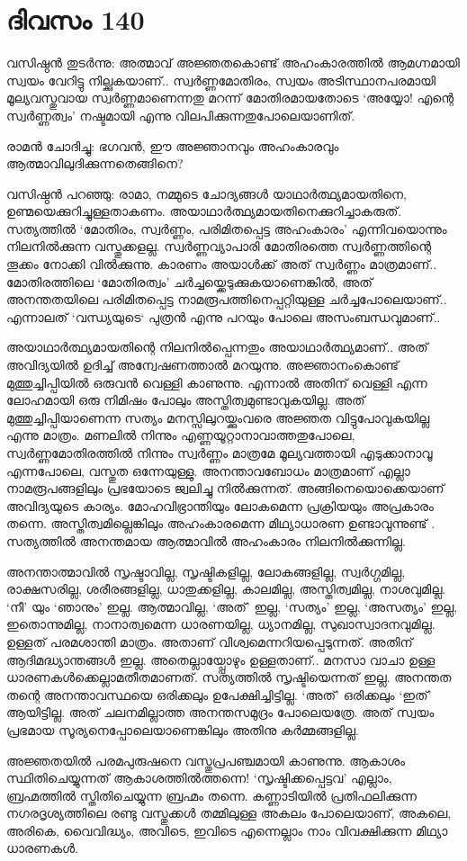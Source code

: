  
\section{ദിവസം 140}


വസിഷ്ഠൻ തുടർന്നു: അത്മാവ് അജ്ഞതകൊണ്ട് അഹംകാരത്തിൽ ആമഗ്നമായി സ്വയം വേറിട്ടു നില്ക്കുകയാണ്‌..  സ്വർണ്ണമോതിരം, സ്വയം അടിസ്ഥാനപരമായി മൂല്യവസ്തുവായ സ്വർണ്ണമാണെന്നതു മറന്ന് മോതിരമായതോടെ  ‘അയ്യോ! എന്റെ സ്വർണ്ണത്വം’ നഷ്ടമായി എന്നു വിലപിക്കുന്നതുപോലെയാണിത്.

രാമൻ ചോദിച്ചു: ഭഗവൻ, ഈ അജ്ഞാനവും അഹംകാരവും ആത്മാവിലുദിക്കുന്നതെങ്ങിനെ?

വസിഷ്ഠൻ പറഞ്ഞു: രാമാ, നമ്മുടെ ചോദ്യങ്ങൾ യാഥാർത്ഥ്യമായതിനെ, ഉണ്മയെക്കുറിച്ചുള്ളതാകണം. അയാഥാർത്ഥ്യമായതിനെക്കുറിച്ചാകരുത്. സത്യത്തിൽ ‘മോതിരം, സ്വർണ്ണം, പരിമിതപ്പെട്ട അഹംകാരം’ എന്നിവയൊന്നും നിലനിൽക്കുന്ന വസ്തുക്കളല്ല. സ്വർണ്ണവ്യാപാരി മോതിരത്തെ സ്വർണ്ണത്തിന്റെ തൂക്കം നോക്കി വിൽക്കുന്നു. കാരണം അയാൾക്ക് അത് സ്വർണ്ണം മാത്രമാണ്‌..  മോതിരത്തിലെ ‘മോതിരത്വം’ ചർച്ചയ്ക്കെടുക്കുകയാണെങ്കിൽ, അത് അനന്തതയിലെ പരിമിതപ്പെട്ട നാമരൂപത്തിനെപ്പറ്റിയുള്ള ചർച്ചപോലെയാണ്‌..  എന്നാലത് `വന്ധ്യയുടെ`  പുത്രൻ എന്നു പറയും പോലെ അസംബന്ധവുമാണ്‌.. 

അയാഥാർത്ഥ്യമായതിന്റെ നിലനിൽപ്പെന്നതും അയാഥാർത്ഥ്യമാണ്‌..  അത് അവിദ്യയിൽ ഉദിച്ച് അന്വേഷണത്താൽ മറയുന്നു. അജ്ഞാനംകൊണ്ട് മുത്തുച്ചിപ്പിയിൽ ഒരുവൻ വെള്ളി കാണുന്നു. എന്നാൽ അതിന്‌ വെള്ളി എന്ന ലോഹമായി ഒരു നിമിഷം പോലും അസ്തിത്വമുണ്ടാവുകയില്ല. അത് മുത്തുച്ചിപ്പിയാണെന്ന സത്യം മനസ്സിലുറയ്ക്കുംവരെ അജ്ഞത വിട്ടുപോവുകയില്ല എന്നു മാത്രം. മണലിൽ നിന്നും എണ്ണയൂറ്റാനാവാത്തതുപോലെ, സ്വർണ്ണമോതിരത്തിൽ നിന്നും സ്വർണ്ണം മാത്രമേ മൂല്യവത്തായി എടുക്കാനാവൂ എന്നപോലെ, വസ്തുത ഒന്നേയുള്ളു. അനന്താവബോധം മാത്രമാണ്‌ എല്ലാ നാമരൂപങ്ങളിലും പ്രഭയോടെ ജ്വലിച്ചു നിൽക്കുന്നത്. അങ്ങിനെയൊക്കെയാണ്‌ അവിദ്യയുടെ കാര്യം. മോഹവിഭ്രാന്തിയും ലോകമെന്ന പ്രക്രിയയും അപ്രകാരം തന്നെ. അസ്തിത്വമില്ലെങ്കിലും അഹംകാരമെന്ന മിഥ്യാധാരണ ഉണ്ടാവുന്നുണ്ട് . സത്യത്തിൽ അനന്തമായ ആത്മാവിൽ അഹംകാരം നിലനിൽക്കുന്നില്ല.

അനന്താത്മാവിൽ സൃഷ്ടാവില്ല, സൃഷ്ടികളില്ല, ലോകങ്ങളില്ല, സ്വർഗ്ഗമില്ല, രാക്ഷസരില്ല, ശരീരങ്ങളില്ല, ധാതുക്കളില്ല, കാലമില്ല, അസ്തിത്വമില്ല, നാശവുമില്ല. ‘നീ’ യും ‘ഞാനും’ ഇല്ല. ആത്മാവില്ല, ‘അത്’ ഇല്ല, ‘സത്യം’ ഇല്ല, ‘അസത്യം’ ഇല്ല, ഇതൊന്നുമില്ല, നാനാത്വമെന്ന ധാരണയില്ല, ധ്യാനമില്ല, സുഖാസ്വാദനവുമില്ല. ഉള്ളത് പരമശാന്തി മാത്രം. അതാണ്‌ വിശ്വമെന്നറിയപ്പെടുന്നത്. അതിന്‌ ആദിമദ്ധ്യാന്തങ്ങൾ ഇല്ല. അതെല്ലായ്പ്പോഴും ഉള്ളതാണ്‌..  മനസാ വാചാ ഉള്ള ധാരണകൾക്കെല്ലാമതീതമാണത്. സത്യത്തിൽ സൃഷ്ടിയെന്നത് ഇല്ല. അനന്തത തന്റെ അനന്താവസ്ഥയെ ഒരിക്കലും ഉപേക്ഷിച്ചിട്ടില്ല. ‘അത്’ ഒരിക്കലും ‘ഇത്’ ആയിട്ടില്ല. അത് ചലനമില്ലാത്ത അനന്തസമുദ്രം പോലെയത്രേ. അത് സ്വയം പ്രഭമായ സൂര്യനെപ്പോലെയാണെങ്കിലും അതിനു കർമ്മങ്ങളില്ല. 

അജ്ഞതയിൽ പരമപുരുഷനെ വസ്തുപ്രപഞ്ചമായി കാണുന്നു. ആകാശം സ്ഥിതിചെയ്യുന്നത് ആകാശത്തിൽത്തന്നെ! ‘സൃഷ്ടിക്കപ്പെട്ടവ’ എല്ലാം, ബ്രഹ്മത്തിൽ സ്തിതിചെയ്യുന്ന ബ്രഹ്മം തന്നെ. കണ്ണാടിയിൽ പ്രതിഫലിക്കുന്ന നഗരദൃശ്യത്തിലെ രണ്ടു വസ്തുക്കൾ തമ്മിലുള്ള അകലം പോലെയാണ്‌, അകലെ, അരികെ, വൈവിദ്ധ്യം, അവിടെ, ഇവിടെ എന്നെല്ലാം നാം വിവക്ഷിക്കുന്ന മിഥ്യാ ധാരണകൾ.

